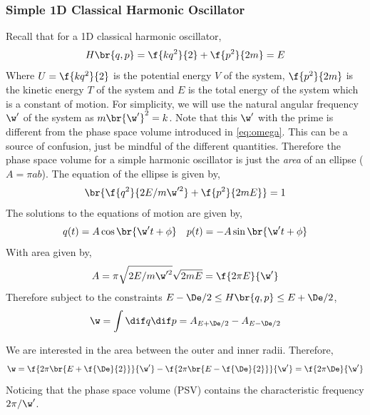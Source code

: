 \documentclass{article}
\begin{document}
\subsubsection{Simple 1D Classical Harmonic Oscillator}
Recall that for a 1D classical harmonic oscillator,
\[ H\br{q,p} = \f{kq^2}{2} + \f{p^2}{2m} = E\]
Where $U = \f{kq^2}{2}$ is the potential energy $V$ of the system, $\f{p^2}{2m}$ is the kinetic energy $T$ of the system and $E$ is the total energy of the system which is a constant of motion. For simplicity, we will use the natural angular frequency $\w'$ of the system as $m \br{\w'}^2 = k$. Note that this $\w'$ with the prime is different from the phase space volume introduced in \eqref{eq:omega}. This can be a source of confusion, just be mindful of the different quantities. Therefore the phase space volume for a simple harmonic oscillator is just the \textit{area} of an ellipse ($A = \pi ab$). The equation of the ellipse is given by,
\[ \br{\f{q^2}{2E/m\w'^2} + \f{p^2}{2mE}} = 1 \]
The solutions to the equations of motion are given by,
\[ q(t) = A \cos \br{\w' t + \phi} \quad p(t) = - A \sin \br{\w' t + \phi} \]
With area given by,
\[A = \pi \sqrt{2E/m\w'^2} \sqrt{2mE} = \f{2\pi E}{\w'}\]
Therefore subject to the constraints $E - \De/2 \leq H\br{q,p} \leq E + \De/2$,
\[ \w = \int \dif q \dif p = A_{E + \De/2} - A_{E - \De/2}\]

\begin{center}
\end{center}

We are interested in the area between the outer and inner radii. Therefore,
\[ \w = \f{2\pi \br{E + \f{\De}{2}}}{\w'} - \f{2\pi \br{E - \f{\De}{2}}}{\w'} = \f{2\pi \De}{\w'} \]
Noticing that the phase space volume (PSV) contains the characteristic frequency $2\pi/\w'$. \\
\end{document}
